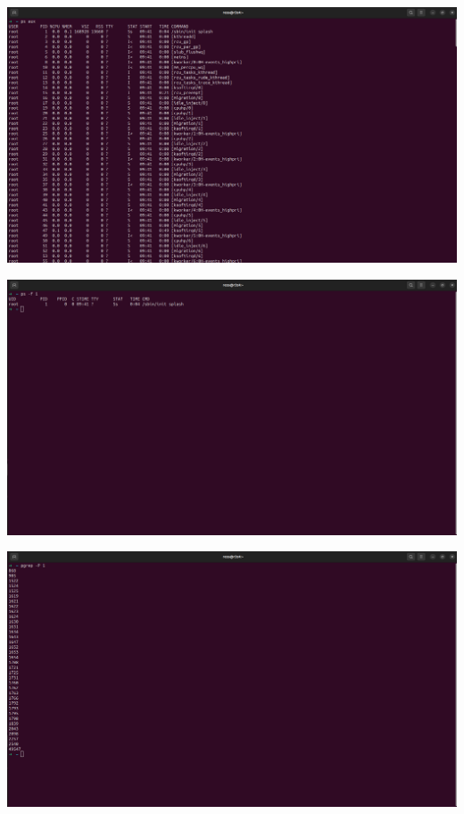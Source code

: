 \begin{qsolve}
	\begin{center}
		\includegraphics[width=\textwidth]{pics/img2.png}
	\end{center}
\end{qsolve}

\begin{qsolve}
	\begin{center}
		\includegraphics[width=\textwidth]{pics/img3.png}
	\end{center}
\end{qsolve}

\begin{qsolve}
	\begin{center}
		\includegraphics[width=\textwidth]{pics/img4.png}
	\end{center}
\end{qsolve}

